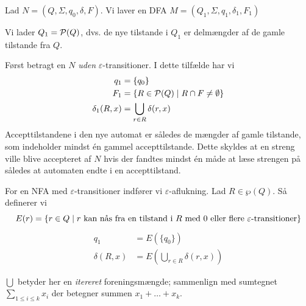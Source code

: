 \documentclass[a4paper,10pt,article]{memoir}
\begin{document}
\begin{bevis}
Lad $N = (Q,\Sigma,q_0,\delta,F)$. Vi laver en DFA $M = (Q_1,\Sigma,q_1,\delta_1,F_1)$

Vi lader $Q_1 = \mathcal{P}(Q)$, dvs. de nye tilstande i $Q_1$ er delmængder af de gamle tilstande fra $Q$. 

Først betragt en $N$ \emph{uden} $\varepsilon$-transitioner. I dette tilfælde har vi
%
\begin{align*}
q_1 & = \{q_0\} \\
F_1 & = \{ R \in \mathcal{P}(Q) \mid  R \cap F \neq \emptyset \} \\
\delta_1(R,x) & = \bigcup \limits_{r \in R}\delta(r,x)
\end{align*}
%
Accepttilstandene i den nye automat er således de mængder af gamle tilstande, som indeholder mindst én gammel accepttilstande. Dette skyldes at en streng ville blive accepteret af $N$ hvis der fandtes mindst én måde at læse strengen på således at automaten endte i en accepttilstand.

For en NFA med $\varepsilon$-transitioner indfører vi $\varepsilon$-aflukning.
Lad $R \in \wp(Q)$. Så definerer vi
%
\[E(r) = \{ r \in Q \mid  r \text{ kan nås fra en tilstand i $R$ med 0 eller flere $\varepsilon$-transitioner} \}\] 
%
\begin{align*}
q_1 & = E(\{q_0\}) \\
\delta(R,x) & = E(\bigcup \limits_{r \in R}\delta(r,x))
\end{align*}
%
\end{bevis}

$\bigcup$ betyder her en \emph{itereret} foreningsmængde; sammenlign med sumtegnet $\sum_{1 \leq i \leq k} x_i$ der betegner summen $x_1 + \ldots + x_k$. 
\end{document}
